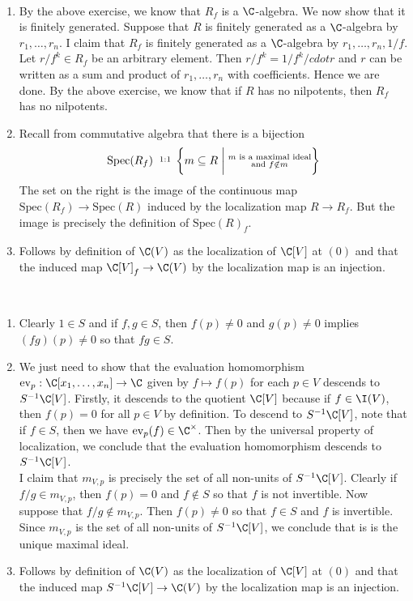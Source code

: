 \documentclass[a4paper]{article}
\begin{document}
\begin{ex}{}{}\\
\begin{enumerate}[label=(\alph*)]
\item By the above exercise, we know that $R_f$ is a $\C$-algebra. We now show that it is finitely generated. Suppose that $R$ is finitely generated as a $\C$-algebra by $r_1,\dots,r_n$. I claim that $R_f$ is finitely generated as a $\C$-algebra by $r_1,\dots,r_n,1/f$. Let $r/f^k\in R_f$ be an arbitrary element. Then $r/f^k=1/f^k/cdot r$ and $r$ can be written as a sum and product of $r_1,\dots,r_n$ with coefficients. Hence we are done. By the above exercise, we know that if $R$ has no nilpotents, then $R_f$ has no nilpotents. 
\item Recall from commutative algebra that there is a bijection $$\text{Spec}(R_f)\;\;\overset{1:1}\;\;\left\{m\subseteq R\;\bigg{|}\;\substack{m\text{ is a maximal ideal}\\\text{and }f\notin m}\right\}$$ The set on the right is the image of the continuous map $\text{Spec}(R_f)\to\text{Spec}(R)$ induced by the localization map $R\to R_f$. But the image is precisely the definition of $\text{Spec}(R)_f$. 
\item Follows by definition of $\C(V)$ as the localization of $\C[V]$ at $(0)$ and that the induced map $\C[V]_f\to\C(V)$ by the localization map is an injection. 
\end{enumerate}
\end{ex}

\begin{ex}{}{}\\
\begin{enumerate}[label=(\alph*)]
\item Clearly $1\in S$ and if $f,g\in S$, then $f(p)\neq 0$ and $g(p)\neq 0$ implies $(fg)(p)\neq 0$ so that $fg\in S$. 
\item We just need to show that the evaluation homomorphism $\text{ev}_p:\C[x_1,\dots,x_n]\to\C$ given by $f\mapsto f(p)$ for each $p\in V$ descends to $S^{-1}\C[V]$. Firstly, it descends to the quotient $\C[V]$ because if $f\in\I(V)$, then $f(p)=0$ for all $p\in V$ by definition. To descend to $S^{-1}\C[V]$, note that if $f\in S$, then we have $\text{ev}_p(f)\in\C^\times$. Then by the universal property of localization, we conclude that the evaluation homomorphism descends to $S^{-1}\C[V]$. \\

I claim that $m_{V,p}$ is precisely the set of all non-units of $S^{-1}\C[V]$. Clearly if $f/g\in m_{V,p}$, then $f(p)=0$ and $f\notin S$ so that $f$ is not invertible. Now suppose that $f/g\notin m_{V,p}$. Then $f(p)\neq 0$ so that $f\in S$ and $f$ is invertible. Since $m_{V,p}$ is the set of all non-units of $S^{-1}\C[V]$, we conclude that is is the unique maximal ideal. 
\item Follows by definition of $\C(V)$ as the localization of $\C[V]$ at $(0)$ and that the induced map $S^{-1}\C[V]\to\C(V)$ by the localization map is an injection. 
\end{enumerate}
\end{ex}
\end{document}
